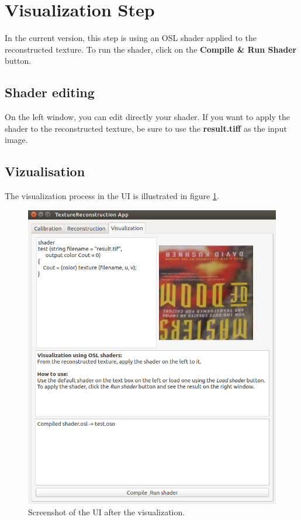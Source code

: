 \documentclass[12pt]{article}
\begin{document}
\section{Visualization Step}
\label{sec:vizu}
In the current version, this step is using an OSL shader applied to the reconstructed texture. To run the shader, click on the \textbf{Compile \& Run Shader} button. 
\subsection{Shader editing}
On the left window, you can edit directly your shader. If you want to apply the shader to the reconstructed texture, be sure to use the \textbf{result.tiff} as the input image.

\subsection{Vizualisation}

The visualization process in the UI is illustrated in figure \ref{fig:visu}.
\begin{figure}[!ht]
    \centering
	\includegraphics[width=0.8\linewidth]{img/visu.PNG}
\caption{Screenshot of the UI after the visualization.}
\label{fig:visu}
\end{figure}
\end{document}
